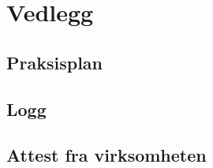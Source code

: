 \section{Vedlegg}

\subsection{Praksisplan}
 \label{praksisplan}

\subsection{Logg}


\subsection{Attest fra virksomheten}
